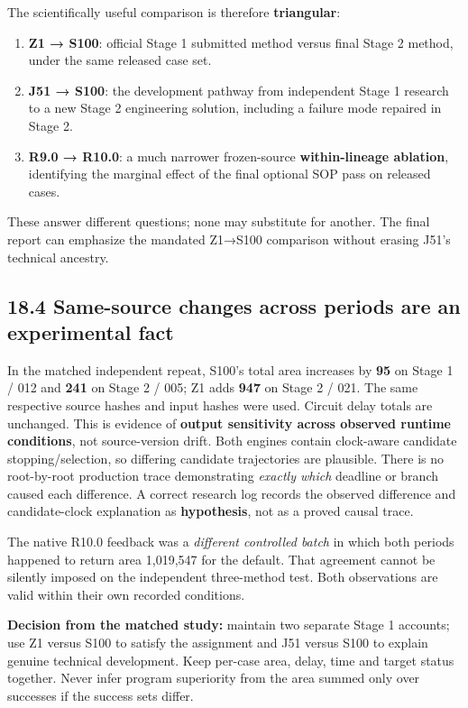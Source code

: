 \documentclass[a4paper,10pt]{article}
\providecommand{\tightlist}{\setlength{\itemsep}{0pt}\setlength{\parskip}{0pt}}
\theoremstyle{definition}
\theoremstyle{remark}
\begin{document}
The scientifically useful comparison is therefore \textbf{triangular}:

\begin{enumerate}
\def\labelenumi{\arabic{enumi}.}
\tightlist
\item
  \textbf{Z1 → S100}: official Stage 1 submitted method versus final Stage 2 method, under the same released case set.
\item
  \textbf{J51 → S100}: the development pathway from independent Stage 1 research to a new Stage 2 engineering solution, including a failure mode repaired in Stage 2.
\item
  \textbf{R9.0 → R10.0}: a much narrower frozen-source \textbf{within-lineage ablation}, identifying the marginal effect of the final optional SOP pass on released cases.
\end{enumerate}

These answer different questions; none may substitute for another. The final report can emphasize the mandated Z1→S100 comparison without erasing J51's technical ancestry.

\subsection{18.4 Same-source changes across periods are an experimental fact}\label{same-source-changes-across-periods-are-an-experimental-fact}

In the matched independent repeat, S100's total area increases by \textbf{95} on Stage 1 / 012 and \textbf{241} on Stage 2 / 005; Z1 adds \textbf{947} on Stage 2 / 021. The same respective source hashes and input hashes were used. Circuit delay totals are unchanged. This is evidence of \textbf{output sensitivity across observed runtime conditions}, not source-version drift. Both engines contain clock-aware candidate stopping/selection, so differing candidate trajectories are plausible. There is no root-by-root production trace demonstrating \emph{exactly which} deadline or branch caused each difference. A correct research log records the observed difference and candidate-clock explanation as \textbf{hypothesis}, not as a proved causal trace.

The native R10.0 feedback was a \emph{different controlled batch} in which both periods happened to return area 1,019,547 for the default. That agreement cannot be silently imposed on the independent three-method test. Both observations are valid within their own recorded conditions.

\begin{tcolorbox}[colback=ResearchBlue!6!white,colframe=ResearchSlate!55!white,boxrule=0.65pt,arc=1mm,breakable]
\textbf{Decision from the matched study:} maintain two separate Stage 1 accounts; use Z1 versus S100 to satisfy the assignment and J51 versus S100 to explain genuine technical development. Keep per-case area, delay, time and target status together. Never infer program superiority from the area summed only over successes if the success sets differ.
\end{tcolorbox}
\end{document}
